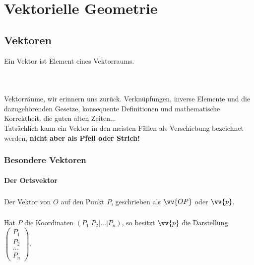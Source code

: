\chapter{Vektorielle Geometrie}


\section{Vektoren}
    \begin{Definition}
        Ein Vektor ist Element eines Vektorraums.
    \end{Definition}\\
    \paragraph{} Vektorräume, wir erinnern uns zurück. Verknüpfungen, inverse Elemente und die dazugehörenden Gesetze, konsequente Definitionen und
    mathematische Korrektheit, die guten alten Zeiten...\\
    Tatsächlich kann ein Vektor in den meisten Fällen als Verschiebung bezeichnet werden, \textbf{nicht aber als Pfeil oder Strich!}\\

    \subsection{Besondere Vektoren}

        \subsubsection{Der Ortsvektor}

            \paragraph{} Der Vektor von $O$ auf den Punkt $P$, geschrieben als $\vv{OP}$ oder $\vv{p}$.\\
            \paragraph{} Hat $P$ die Koordinaten $(P_1|P_2|...|P_n)$, so besitzt $\vv{p}$ die Darstellung $\left(\begin{array}{c} P_1 \\ P_2 \\ ...\\P_n\end{array}\right)$.

